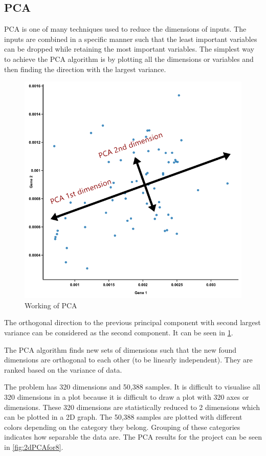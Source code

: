 \documentclass[12pt, a4paper]{article}
\begin{document}
\subsection{\gls{PCA}}
\gls{PCA} is one of many techniques used to reduce the dimensions of inputs. The inputs are combined in a specific manner such that the least important variables can be dropped while retaining the most important variables. The simplest way to achieve the PCA algorithm is by plotting all the dimensions or variables and then finding the direction with the largest variance. \begin{figure}[!ht]
\centering
    \begin{center}
        \includegraphics[width = 14.4 cm]{howPCAworks.png}
    \end{center}
    \caption{Working of PCA}
    \label{fig:howPCAWorks}
\end{figure} The orthogonal direction to the previous principal component with second largest variance can be considered as the second component. It can be seen in \ref{fig:howPCAWorks}.

The \gls{PCA} algorithm finds new sets of dimensions such that the new found dimensions are orthogonal to each other (to be linearly independent). They are ranked based on the variance of data.

The problem has 320 dimensions and 50,388 samples. It is difficult to visualise all 320 dimensions in a plot because it is difficult to draw a plot with 320 axes or dimensions. These 320 dimensions are statistically reduced to 2 dimensions which can be plotted in a 2D graph. The 50,388 samples are plotted with different colors depending on the category they belong. Grouping of these categories indicates how separable the data are. The PCA results for the project can be seen in \ref{fig:2dPCAfor8}.
\end{document}
